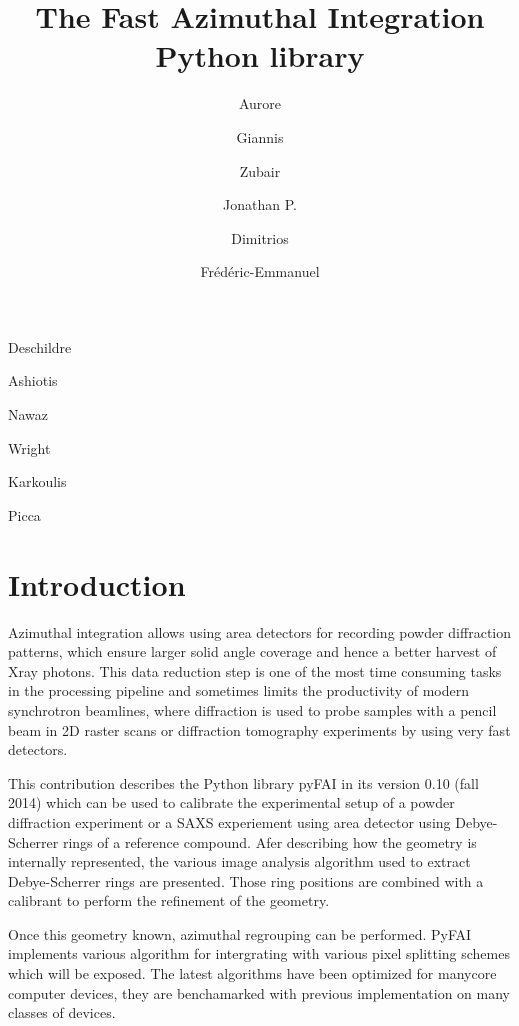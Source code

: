 \documentclass[preprint]{iucr}
\begin{document}
\title{The Fast Azimuthal Integration Python library}

    \author[a]{Aurore}{Deschildre}
    \author[a]{Giannis}{Ashiotis}
    \author[b]{Zubair}{Nawaz}
    \author[a]{Jonathan P.}{Wright}
    \author[a]{Dimitrios}{Karkoulis}
    \author[c]{Fr\'ed\'eric-Emmanuel}{Picca}

\maketitle

\begin{synopsis}

\end{synopsis}

\begin{abstract}
\end{abstract}

\section{Introduction}
Azimuthal integration allows using area detectors for recording powder
diffraction patterns, which  ensure larger solid angle coverage and hence a better harvest of X­ray photons. 
This data reduction 
step is one of the most time ­consuming tasks in the processing pipeline and
sometimes limits the productivity of modern synchrotron beamlines, where
diffraction is used to probe samples with a  pencil beam in 2D raster scans or
diffraction tomography experiments by using very fast detectors. 

This contribution describes the Python library pyFAI in its version 0.10 (fall
2014) which can be used to calibrate the experimental setup of a powder
diffraction experiment or a SAXS experiement using area detector using
Debye-Scherrer rings of a reference compound. 
Afer describing how the geometry is internally represented, the various
image analysis algorithm used to extract Debye-Scherrer rings are presented.
Those ring positions are combined with a calibrant to perform the refinement
of the geometry.

Once this geometry known, azimuthal regrouping can be performed. 
PyFAI implements various algorithm for intergrating with various pixel splitting
schemes which will be exposed. 
The latest algorithms have been optimized for
manycore computer devices, they are benchamarked with previous implementation on
many classes of devices.
\end{document}
